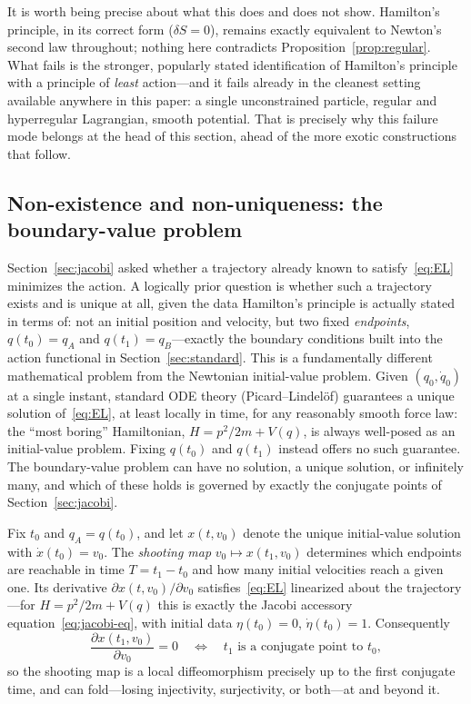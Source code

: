\documentclass[11pt]{article}
\newcommand{\dd}[2]{\frac{\partial #1}{\partial #2}}
\begin{document}
It is worth being precise about what this does and does not show. Hamilton's principle, in its correct form ($\delta S=0$), remains exactly equivalent to Newton's second law throughout; nothing here contradicts Proposition~\ref{prop:regular}. What fails is the stronger, popularly stated identification of Hamilton's principle with a principle of \emph{least} action---and it fails already in the cleanest setting available anywhere in this paper: a single unconstrained particle, regular and hyperregular Lagrangian, smooth potential. That is precisely why this failure mode belongs at the head of this section, ahead of the more exotic constructions that follow.

\subsection{Non-existence and non-uniqueness: the boundary-value problem}
\label{sec:bvp}

Section~\ref{sec:jacobi} asked whether a trajectory already known to satisfy~\eqref{eq:EL} minimizes the action. A logically prior question is whether such a trajectory exists and is unique at all, given the data Hamilton's principle is actually stated in terms of: not an initial position and velocity, but two fixed \emph{endpoints}, $q(t_0)=q_A$ and $q(t_1)=q_B$---exactly the boundary conditions built into the action functional in Section~\ref{sec:standard}. This is a fundamentally different mathematical problem from the Newtonian initial-value problem. Given $(q_0,\dot q_0)$ at a single instant, standard ODE theory (Picard--Lindelöf) guarantees a unique solution of~\eqref{eq:EL}, at least locally in time, for any reasonably smooth force law: the ``most boring'' Hamiltonian, $H=p^2/2m+V(q)$, is always well-posed as an initial-value problem. Fixing $q(t_0)$ and $q(t_1)$ instead offers no such guarantee. The boundary-value problem can have no solution, a unique solution, or infinitely many, and which of these holds is governed by exactly the conjugate points of Section~\ref{sec:jacobi}.

Fix $t_0$ and $q_A=q(t_0)$, and let $x(t,v_0)$ denote the unique initial-value solution with $\dot x(t_0)=v_0$. The \emph{shooting map} $v_0\mapsto x(t_1,v_0)$ determines which endpoints are reachable in time $T=t_1-t_0$ and how many initial velocities reach a given one. Its derivative $\partial x(t,v_0)/\partial v_0$ satisfies~\eqref{eq:EL} linearized about the trajectory---for $H=p^2/2m+V(q)$ this is exactly the Jacobi accessory equation~\eqref{eq:jacobi-eq}, with initial data $\eta(t_0)=0$, $\dot\eta(t_0)=1$. Consequently
\begin{equation}
\dd{x(t_1,v_0)}{v_0} = 0 \quad\Longleftrightarrow\quad t_1 \text{ is a conjugate point to } t_0 ,
\end{equation}
so the shooting map is a local diffeomorphism precisely up to the first conjugate time, and can fold---losing injectivity, surjectivity, or both---at and beyond it.
\end{document}
